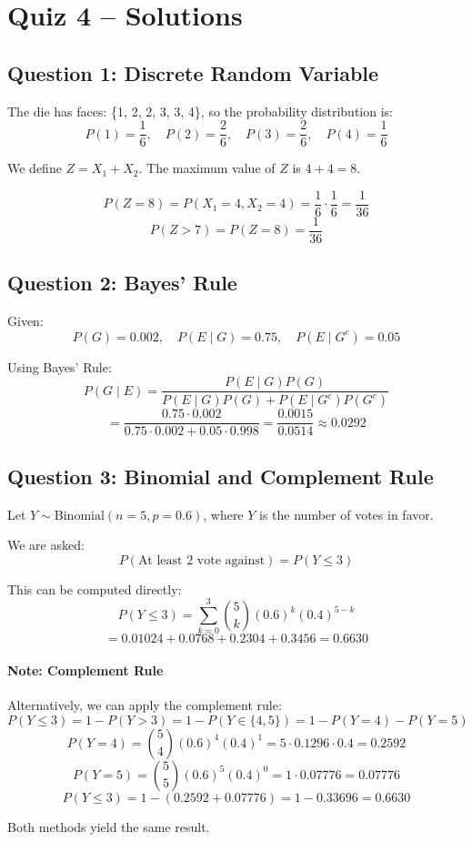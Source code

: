 \documentclass{article}
\begin{document}
\section*{Quiz 4 – Solutions}

\subsection*{Question 1: Discrete Random Variable}

The die has faces: \{1, 2, 2, 3, 3, 4\}, so the probability distribution is:
\[
P(1) = \frac{1}{6}, \quad P(2) = \frac{2}{6}, \quad P(3) = \frac{2}{6}, \quad P(4) = \frac{1}{6}
\]

We define \( Z = X_1 + X_2 \). The maximum value of \( Z \) is \( 4 + 4 = 8 \).

\[
P(Z = 8) = P(X_1 = 4, X_2 = 4) = \frac{1}{6} \cdot \frac{1}{6} = \frac{1}{36}
\]
\[
P(Z > 7) = P(Z = 8) =  \boxed{\frac{1}{36}}
\]

\subsection*{Question 2: Bayes' Rule}

Given:
\[
P(G) = 0.002, \quad P(E \mid G) = 0.75, \quad P(E \mid G^c) = 0.05
\]

Using Bayes' Rule:
\[
P(G \mid E) = \frac{P(E \mid G) P(G)}{P(E \mid G)P(G) + P(E \mid G^c)P(G^c)}
\]
\[
= \frac{0.75 \cdot 0.002}{0.75 \cdot 0.002 + 0.05 \cdot 0.998} = \frac{0.0015}{0.0514} \approx \boxed{0.0292}
\]

\subsection*{Question 3: Binomial and Complement Rule}

Let \( Y \sim \text{Binomial}(n = 5, p = 0.6) \), where \( Y \) is the number of votes in favor.

We are asked:
\[
P(\text{At least 2 vote against}) = P(Y \leq 3)
\]

This can be computed directly:
\[
P(Y \leq 3) = \sum_{k=0}^{3} \binom{5}{k} (0.6)^k (0.4)^{5-k}
\]
\[
= 0.01024 + 0.0768 + 0.2304 + 0.3456 = \boxed{0.6630}
\]

\paragraph*{Note: Complement Rule}

Alternatively, we can apply the complement rule:
\[
P(Y \leq 3) = 1 - P(Y > 3) = 1 - P(Y \in \{4, 5\})   = 1 - P(Y = 4) - P(Y = 5)
\]
\[
P(Y = 4) = \binom{5}{4} (0.6)^4 (0.4)^1 = 5 \cdot 0.1296 \cdot 0.4 = 0.2592
\]
\[
P(Y = 5) = \binom{5}{5} (0.6)^5 (0.4)^0 = 1 \cdot 0.07776 = 0.07776
\]
\[
P(Y \leq 3) = 1 - (0.2592 + 0.07776) = 1 - 0.33696 = \boxed{0.6630}
\]

Both methods yield the same result.
\end{document}
